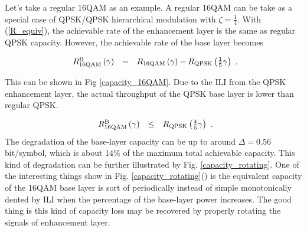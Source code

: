 \documentclass[10pt,fleqn, twocolumn]{IEEEtran}
\begin{document}
\noindent Let's take a regular 16QAM as an example. A regular
16QAM can be take as a special case of QPSK/QPSK hierarchical
modulation with $\zeta=\frac{1}{4}$. With (\ref{R_equiv}), the
achievable rate of the enhancement layer is the same as regular
QPSK capacity. However, the achievable rate of the base layer
becomes

\begin{equation}
\begin{array}{rcl}
R_{\rm 16QAM}^{\rm B}\left(\gamma\right)&=&R_{\rm
16QAM}\left(\gamma\right) - R_{\rm QPSK}
\left(\frac{1}{5}\gamma\right)
\end{array}.\label{R_16QAM_B1}
\end{equation}

\noindent This can be shown in Fig \ref{capacity_16QAM}. Due to
the ILI from the QPSK enhancement layer, the actual throughput of
the QPSK base layer is lower than regular QPSK.

\begin{equation}
\begin{array}{rcl}
R_{\rm 16QAM}^{\rm B}\left(\gamma\right)&\leq&R_{\rm QPSK}
\left(\frac{4}{5}\gamma\right)
\end{array}.\label{R_16QAM_B2}
\end{equation}
\noindent The degradation of the base-layer capacity can be up to
around $\Delta=0.56$ bit/symbol, which is about $14\%$ of the
maximum total achievable capacity. This kind of degradation can be
further illustrated by Fig. \ref{capacity_rotating}. One of the
interesting things show in Fig. \ref{capacity_rotating}() is the
equivalent capacity of the 16QAM base layer is sort of
periodically instead of simple monotonically dented by ILI when
the percentage of the base-layer power increases. The good thing
is this kind of capacity loss may be recovered by properly
rotating the signals of enhancement layer.
\begin{figure}
\end{figure}
\end{document}
